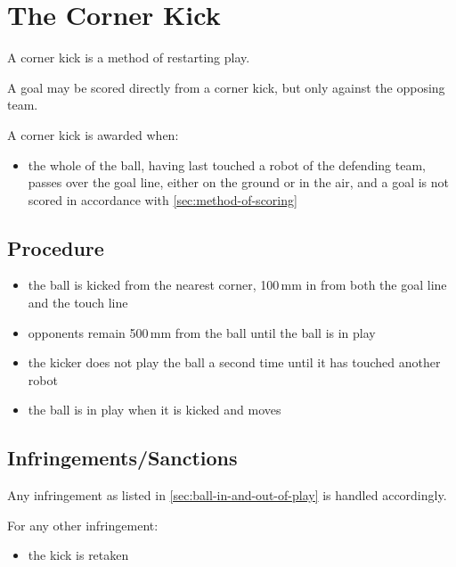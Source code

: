 \section{The Corner Kick}\label{sec:corner-kick}

A corner kick is a method of restarting play.

A goal may be scored directly from a corner kick, but only against the opposing team.

A corner kick is awarded when:

\begin{itemize}
\item the whole of the ball, having last touched a robot of the defending team, passes over the goal line, either on the ground or in the air, and a goal is not scored in accordance with \autoref{sec:method-of-scoring}
\end{itemize}

\subsection{Procedure}
\begin{itemize}
\item the ball is kicked from the nearest corner, 100\,mm in from both the goal line and the touch line
\item opponents remain 500\,mm from the ball until the ball is in play
\item the kicker does not play the ball a second time until it has touched another robot
\item the ball is in play when it is kicked and moves
\end{itemize}

\subsection{Infringements/Sanctions}
Any infringement as listed in \autoref{sec:ball-in-and-out-of-play} is handled accordingly.

For any other infringement:

\begin{itemize}
\item the kick is retaken
\end{itemize}
